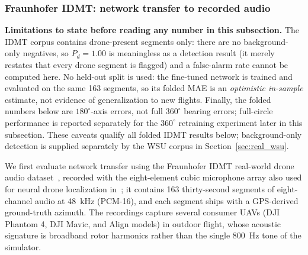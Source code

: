 \documentclass[5p,twocolumn]{elsarticle}
\begin{document}
\subsubsection{Fraunhofer IDMT: network transfer to recorded audio}
\label{sec:real_idmt}
\textbf{Limitations to state before reading any number in this subsection.} The IDMT corpus contains drone-present segments only: there are no background-only negatives, so $P_d=1.00$ is meaningless as a detection result (it merely restates that every drone segment is flagged) and a false-alarm rate cannot be computed here. No held-out split is used: the fine-tuned network is trained and evaluated on the same 163 segments, so its folded MAE is an \emph{optimistic in-sample} estimate, not evidence of generalization to new flights. Finally, the folded numbers below are $180^\circ$-axis errors, not full $360^\circ$ bearing errors; full-circle performance is reported separately for the $360^\circ$ retraining experiment later in this subsection. These caveats qualify all folded IDMT results below; background-only detection is supplied separately by the WSU corpus in Section~\ref{sec:real_wsu}.

We first evaluate network transfer using the Fraunhofer IDMT real-world drone audio dataset~\cite{idmt2025drone}, recorded with the eight-element cubic microphone array also used for neural drone localization in~\cite{yang2025eusipco}; it contains 163 thirty-second segments of eight-channel audio at \SI{48}{\kilo\hertz} (PCM-16), and each segment ships with a GPS-derived ground-truth azimuth. The recordings capture several consumer UAVs (DJI Phantom 4, DJI Mavic, and Align models) in outdoor flight, whose acoustic signature is broadband rotor harmonics rather than the single \SI{800}{\hertz} tone of the simulator.
\end{document}
